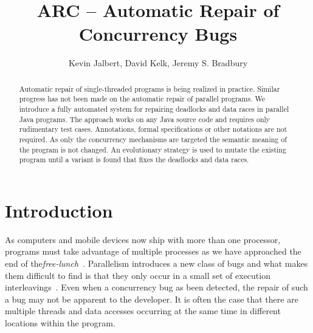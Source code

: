 \documentclass{llncs}
\begin{document}
\title{ARC -- Automatic Repair of Concurrency Bugs}

\author{Kevin Jalbert, David Kelk, Jeremy S. Bradbury}


\maketitle

\begin{abstract}

Automatic repair of single-threaded programs is being realized in practice.
Similar progress has not been made on the automatic repair of parallel
programs. We introduce a fully automated system for repairing
deadlocks and data races in parallel Java programs. The approach works on any
Java source code and requires only rudimentary test cases. Annotations, formal
specifications or other notations are not required. As only the concurrency
mechanisms are targeted the semantic meaning of the program is not changed.
An evolutionary strategy is used to mutate the existing program
until a variant is found that fixes the deadlocks and data races.

\end{abstract}

\section{Introduction}
\label{sec:introduction}

As computers and mobile devices now ship with more than one processor, programs
must take advantage of multiple processes as we have approached the end of
the\textit{free-lunch}~\cite{SL05}. Parallelism introduces a new class of bugs
and what makes them difficult to find is that they only occur in a small set of
execution interleavings~\cite{MQB07}. Even when a concurrency bug as been
detected, the repair of such a bug may not be apparent to the developer. It is
often the case that there are multiple threads and data accesses occurring at
the same time in different locations within the program.
\end{document}
